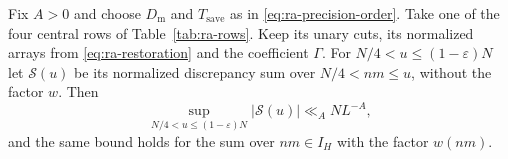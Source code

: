 \begin{lemma}
\label{lem:ra-product-region}
Fix \(A>0\) and choose \(D_{\mathrm m}\) and \(T_{\mathrm{save}}\) as in
\eqref{eq:ra-precision-order}. Take one of the four central rows of
Table~\ref{tab:ra-rows}.
Keep its unary cuts, its normalized arrays from
\eqref{eq:ra-restoration} and the coefficient \(\Gamma\). For
\(N/4<u\le(1-\varepsilon)N\) let \(\mathcal S(u)\) be its normalized
discrepancy sum over \(N/4<nm\le u\), without the factor \(w\). Then
\begin{equation}\label{eq:ra-central-rows}
 \sup_{N/4<u\le(1-\varepsilon)N}|\mathcal S(u)|\ll_A NL^{-A},
\end{equation}
and the same bound holds for the sum over \(nm\in I_H\) with the factor
\(w(nm)\).
\end{lemma}
